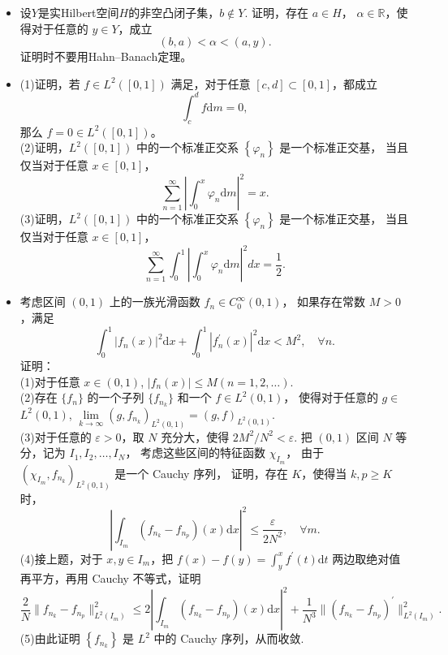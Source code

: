\begin{itemize}
	\item[1]设$Y$是实Hilbert空间$H$的非空凸闭子集，$b \notin Y$. 
	证明，存在 $a \in H$， $\alpha \in \mathbb{R}$，使得对于任意的 $y \in Y$，成立
	$$(b, a)<\alpha<(a, y).$$
	证明时不要用Hahn--Banach定理。\\
	\item[2](1)证明，若 $f \in L^{2}([0,1])$ 满足，对于任意 $[c, d] \subset[0,1]$，都成立
	$$\int_{c}^{d} f \mathrm{d} m=0,$$
	那么 $f=0 \in L^{2}([0,1])$。\\
	(2)证明，$L^{2}([0,1])$ 中的一个标准正交系 $\left\{\varphi_{n}\right\}$ 是一个标准正交基，
	当且仅当对于任意 $x \in[0,1]$，
	$$\sum_{n=1}^{\infty}\left|\int_{0}^{x} \varphi_{n} \mathrm{d} m\right|^{2}=x.$$
	(3)证明，$L^{2}([0,1])$ 中的一个标准正交系 $\left\{\varphi_{n}\right\}$ 是一个标准正交基，
    当且仅当对于任意 $x \in[0,1]$，
	$$\sum_{n=1}^{\infty} \int_{0}^{1}\left|\int_{0}^{x} \varphi_{n} \mathrm{d} m\right|^{2} d x=\frac{1}{2}.$$
	\item[3]考虑区间 $(0,1)$ 上的一族光滑函数 $f_{n} \in C_{0}^{\infty}(0,1)$，
	如果存在常数 $M> 0$，满足
	$$\int_{0}^{1}|f_{n}(x)|^{2} \mathrm{d} x
	+\int_{0}^{1}|f_{n}^{\prime}(x)|^{2} \mathrm{d} x<M^{2}, \quad \forall n .$$
	证明：\\
	(1)对于任意 $x \in(0,1)$, $|f_{n}(x)| \leqslant M(n=1,2, \ldots)$.\\
	(2)存在 $\{f_{n}\}$ 的一个子列 $\{f_{n_{k}}\}$ 和一个 $f \in L^{2}(0,1)$，
	使得对于任意的 $g \in$ $L^{2}(0,1)$, $\lim\limits_{k \rightarrow \infty}(g, f_{n_{k}})_{L^{2}(0,1)}=(g, f)_{L^{2}(0,1)}$.\\
	(3)对于任意的 $\varepsilon>0$，取 $N$ 充分大，使得 $2 M^{2} / N^{2}<\varepsilon$. 
	把 $(0,1)$ 区间 $N$ 等分，记为 $I_{1}, I_{2}, \ldots, I_{N}$，
	考虑这些区间的特征函数 $\chi_{I_{m}}$，
	由于 $\left(\chi_{I_{m}}, f_{n_{k}}\right)_{L^{2}(0,1)}$ 是一个 Cauchy 序列，
	证明，存在 $K$，使得当 $k, p \geqslant K$ 时，
	$$\left|\int_{I_{m}}(f_{n_{k}}-f_{n_{p}})(x) \mathrm{d} x\right|^{2} 
    \leqslant \frac{\varepsilon}{2 N^{2}},\quad  \forall m.$$
	(4)接上题，对于 $x, y \in I_{m}$，把 $\displaystyle f(x)-f(y)=\int_{y}^{x} f^{\prime}(t) \mathrm{d} t$ 两边取绝对值再平方，再用 Cauchy 不等式，证明
	$$\frac{2}{N}\|f_{n_{k}}-f_{n_{p}}\|_{L^{2}(I_{m})}^{2} 
	\leqslant 2\left|\int_{I_{m}}(f_{n_{k}}-f_{n_{p}})(x) \mathrm{d} x\right|^{2}
	+\frac{1}{N^{3}}\|(f_{n_{k}}-f_{n_{p}})^{\prime}\|_{L^{2}(I_{m})}^{2}.$$
	(5)由此证明 $\left\{f_{n_{k}}\right\}$ 是 $L^{2}$ 中的 Cauchy 序列，从而收敛.\\
    [上传者注：本题的目标是证明$H^1(0,1) \hookrightarrow L^2(0,1)$是紧嵌入.]
\end{itemize}

